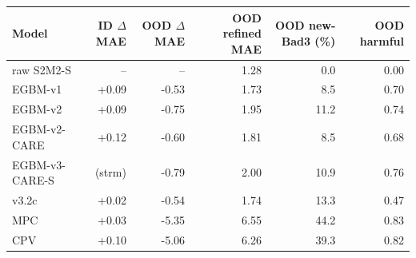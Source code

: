 \begin{tabular}{lrrrrr}
\toprule
Model & ID $\Delta$MAE & OOD $\Delta$MAE & OOD refined MAE & OOD new-Bad3 (\%) & OOD harmful \\
\midrule
raw S2M2-S & -- & -- & 1.28 & 0.0 & 0.00 \\
EGBM-v1 & +0.09 & -0.53 & 1.73 & 8.5 & 0.70 \\
EGBM-v2 & +0.09 & -0.75 & 1.95 & 11.2 & 0.74 \\
EGBM-v2-CARE & +0.12 & -0.60 & 1.81 & 8.5 & 0.68 \\
EGBM-v3-CARE-S & (strm) & -0.79 & 2.00 & 10.9 & 0.76 \\
v3.2c & +0.02 & -0.54 & 1.74 & 13.3 & 0.47 \\
MPC & +0.03 & -5.35 & 6.55 & 44.2 & 0.83 \\
CPV & +0.10 & -5.06 & 6.26 & 39.3 & 0.82 \\
\bottomrule
\end{tabular}
